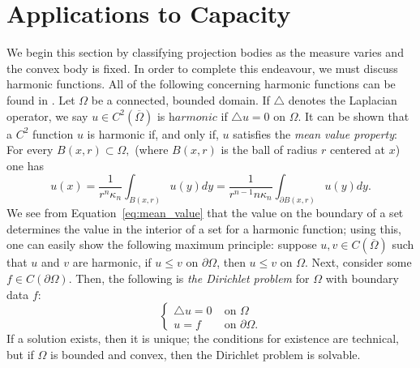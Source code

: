\documentclass[11pt]{amsart}
\theoremstyle{definition}
\theoremstyle{remark}
\numberwithin{equation}{section}
\begin{document}
\section{Applications to Capacity}
\label{s:con}
We begin this section by classifying projection bodies as the measure varies and the convex body is fixed. In order to complete this endeavour, we must discuss harmonic functions. All of the following concerning harmonic functions can be found in \cite{Evans}. Let $\Omega$ be a connected, bounded domain. If $\triangle$ denotes the Laplacian operator, we say $u\in C^2(\overline{\Omega})$ is $\textit{harmonic}$ if $\triangle u = 0$ on $\Omega$.
It can be shown that a $C^2$ function $u$ is harmonic if, and only if, $u$ satisfies the \textit{mean value property}:
For every $B(x,r)\subset \Omega,$ (where $B(x,r)$ is the ball of radius $r$ centered at $x$) one has
\begin{equation}
    u(x)=\frac{1}{r^n\kappa_n}\int_{B(x,r)}u(y)dy=\frac{1}{r^{n-1}n\kappa_n}\int_{\partial B(x,r)}u(y)dy.
    \label{eq:mean_value}
\end{equation}
We see from Equation~\ref{eq:mean_value} that the value on the boundary of a set determines the value in the interior of a set for a harmonic function; using this, one can easily show the following maximum principle: suppose $u,v\in C(\overline{\Omega})$ such that $u$ and $v$ are harmonic, if $u\leq v$ on $\partial \Omega$, then $u\leq v$ on $\Omega.$ Next, consider some $f\in C(\partial \Omega)$. Then, the following is \textit{the Dirichlet problem} for $\Omega$ with boundary data $f$:
\begin{equation}
    \begin{cases}
    \triangle u = 0 \; &\text{on } \Omega
    \\
    u=f \; &\text{on } \partial \Omega.
    \end{cases}
    \label{dirichlet}
\end{equation}
If a solution exists, then it is unique; the conditions for existence are technical, but if $\Omega$ is bounded and convex, then the Dirichlet problem is solvable.
\end{document}
